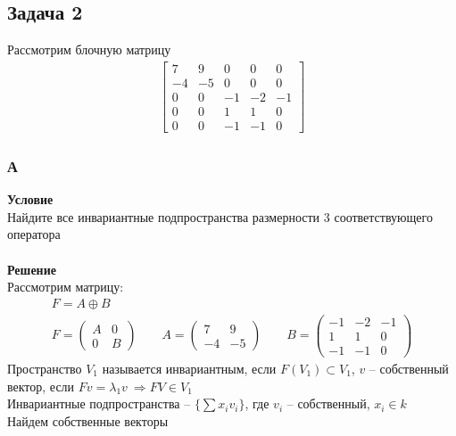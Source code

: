 		\subsection*{\textbf{Задача 2}}
		Рассмотрим блочную матрицу
		\begin{gather*}
			\left[\begin{array}{ccccc}
				7 & 9 & 0 & 0 & 0 \\
				-4 & -5 & 0 & 0 & 0 \\
				0 & 0 & -1 & -2 & -1 \\
				0 & 0 & 1 & 1 & 0 \\
				0 & 0 & -1 & -1 & 0
			\end{array}\right]
		\end{gather*}
		\subsubsection*{\textbf{А}}
		\textbf{Условие}\\
		 Найдите все инвариантные подпространства размерности 3 соответствующего оператора\\
		\\
		\textbf{Решение}\\
		Рассмотрим матрицу:
		\begin{gather*}
			F = A \oplus B\\
			F = 
			\begin{pmatrix}
				A & 0\\
				0 & B
			\end{pmatrix}
			\qquad 
			A = 
			\begin{pmatrix}
				7 & 9\\
				-4 & -5
			\end{pmatrix}
			\qquad
			B = 
			\begin{pmatrix}
				-1 & -2 & -1\\
				1 & 1 & 0\\
				-1 & -1 & 0
			\end{pmatrix}
		\end{gather*}
		Пространство $V_1$ называется инвариантным, если $F(V_1) \subset V_1$, $v$ -- собственный вектор, если $Fv = \lambda_1 v\ \Rightarrow FV \in V_1$\\
		Инвариантные подпространства -- $\{\sum x_i v_i\}$, где $v_i$ -- собственный, $x_i \in k$\\
		Найдем собственные векторы
